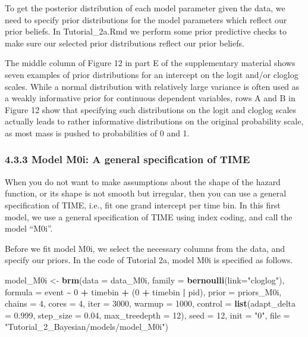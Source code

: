 \documentclass[
  man, donotrepeattitle,floatsintext]{apa6}
\newenvironment{Shaded}{\begin{snugshade}}{\end{snugshade}}
\newcommand{\AttributeTok}[1]{\textcolor[rgb]{0.13,0.29,0.53}{#1}}
\newcommand{\DecValTok}[1]{\textcolor[rgb]{0.00,0.00,0.81}{#1}}
\newcommand{\FloatTok}[1]{\textcolor[rgb]{0.00,0.00,0.81}{#1}}
\newcommand{\FunctionTok}[1]{\textcolor[rgb]{0.13,0.29,0.53}{\textbf{#1}}}
\newcommand{\NormalTok}[1]{#1}
\newcommand{\OtherTok}[1]{\textcolor[rgb]{0.56,0.35,0.01}{#1}}
\newcommand{\SpecialCharTok}[1]{\textcolor[rgb]{0.81,0.36,0.00}{\textbf{#1}}}
\newcommand{\StringTok}[1]{\textcolor[rgb]{0.31,0.60,0.02}{#1}}
\begin{document}
To get the posterior distribution of each model parameter given the data, we need to specify prior distributions for the model parameters which reflect our prior beliefs.
In Tutorial\_2a.Rmd we perform some prior predictive checks to make sure our selected prior distributions reflect our prior beliefs.

The middle column of Figure 12 in part E of the supplementary material shows seven examples of prior distributions for an intercept on the logit and/or cloglog scales. While a normal distribution with relatively large variance is often used as a weakly informative prior for continuous dependent variables, rows A and B in Figure 12 show that specifying such distributions on the logit and cloglog scales actually leads to rather informative distributions on the original probability scale, as most mass is pushed to probabilities of 0 and 1.

\subsubsection{4.3.3 Model M0i: A general specification of TIME}\label{model-m0i-a-general-specification-of-time}

When you do not want to make assumptions about the shape of the hazard function, or its shape is not smooth but irregular, then you can use a general specification of TIME, i.e., fit one grand intercept per time bin. In this first model, we use a general specification of TIME using index coding, and call the model ``M0i''.

Before we fit model M0i, we select the necessary columns from the data, and specify our priors. In the code of Tutorial 2a, model M0i is specified as follows.

\begin{Shaded}
\begin{Highlighting}[]
\NormalTok{model\_M0i }\OtherTok{\textless{}{-}}                    
   \FunctionTok{brm}\NormalTok{(}\AttributeTok{data =}\NormalTok{ data\_M0i,}
       \AttributeTok{family =} \FunctionTok{bernoulli}\NormalTok{(}\AttributeTok{link=}\StringTok{"cloglog"}\NormalTok{),}
       \AttributeTok{formula =}\NormalTok{ event }\SpecialCharTok{\textasciitilde{}} \DecValTok{0} \SpecialCharTok{+}\NormalTok{ timebin }\SpecialCharTok{+}\NormalTok{ (}\DecValTok{0} \SpecialCharTok{+}\NormalTok{ timebin }\SpecialCharTok{|}\NormalTok{ pid),}
       \AttributeTok{prior =}\NormalTok{ priors\_M0i,}
       \AttributeTok{chains =} \DecValTok{4}\NormalTok{, }\AttributeTok{cores =} \DecValTok{4}\NormalTok{, }
       \AttributeTok{iter =} \DecValTok{3000}\NormalTok{, }\AttributeTok{warmup =} \DecValTok{1000}\NormalTok{,}
       \AttributeTok{control =} \FunctionTok{list}\NormalTok{(}\AttributeTok{adapt\_delta =} \FloatTok{0.999}\NormalTok{, }
                      \AttributeTok{step\_size =} \FloatTok{0.04}\NormalTok{, }
                      \AttributeTok{max\_treedepth =} \DecValTok{12}\NormalTok{),}
       \AttributeTok{seed =} \DecValTok{12}\NormalTok{, }\AttributeTok{init =} \StringTok{"0"}\NormalTok{,}
       \AttributeTok{file =} \StringTok{"Tutorial\_2\_Bayesian/models/model\_M0i"}\NormalTok{)}
\end{Highlighting}
\end{Shaded}
\end{document}
